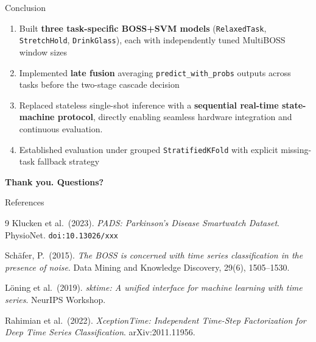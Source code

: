 \documentclass[aspectratio=169, 11pt]{beamer}
\begin{document}
\begin{frame}{Conclusion}
  \small
  \begin{enumerate}
    \item Built \textbf{three task-specific BOSS+SVM models}
          (\texttt{RelaxedTask}, \texttt{StretchHold}, \texttt{DrinkGlass}),
          each with independently tuned MultiBOSS window sizes
    \vspace{0.3em}
    \item Implemented \textbf{late fusion} averaging
          \texttt{predict\_with\_probs} outputs across tasks before the
          two-stage cascade decision
    \vspace{0.3em}
    \item Replaced stateless single-shot inference with a
          \textbf{sequential real-time state-machine protocol}, directly
          enabling seamless hardware integration and continuous evaluation.
    \vspace{0.3em}
    \item Established evaluation under grouped \texttt{StratifiedKFold}
          with explicit missing-task fallback strategy
  \end{enumerate}

  \vspace{0.5em}
  \begin{center}
    \large\textbf{Thank you. Questions?}
  \end{center}
\end{frame}

\begin{frame}{References}
  \small
  \begin{thebibliography}{9}
      Klucken et al.\ (2023).
      \textit{PADS: Parkinson's Disease Smartwatch Dataset}.
      PhysioNet. \texttt{doi:10.13026/xxx}

      Sch\"{a}fer, P.\ (2015).
      \textit{The BOSS is concerned with time series classification in the
      presence of noise}.
      Data Mining and Knowledge Discovery, 29(6), 1505--1530.

      L\"{o}ning et al.\ (2019).
      \textit{sktime: A unified interface for machine learning with time series}.
      NeurIPS Workshop.

      Rahimian et al.\ (2022).
      \textit{XceptionTime: Independent Time-Step Factorization for Deep
      Time Series Classification}.
      arXiv:2011.11956.
  \end{thebibliography}
\end{frame}
\end{document}
